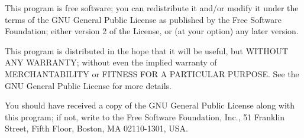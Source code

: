 \documentclass[10pt,a4paper]{report}
\begin{document}
This program is free software; you can redistribute it and/or
modify it under the terms of the GNU General Public License
as published by the Free Software Foundation; either version 2
of the License, or (at your option) any later version.

This program is distributed in the hope that it will be useful,
but WITHOUT ANY WARRANTY; without even the implied warranty of
MERCHANTABILITY or FITNESS FOR A PARTICULAR PURPOSE.  See the
GNU General Public License for more details.

You should have received a copy of the GNU General Public License
along with this program; if not, write to the Free Software
Foundation, Inc., 51 Franklin Street, Fifth Floor, Boston, MA  02110-1301, USA.
\end{document}
